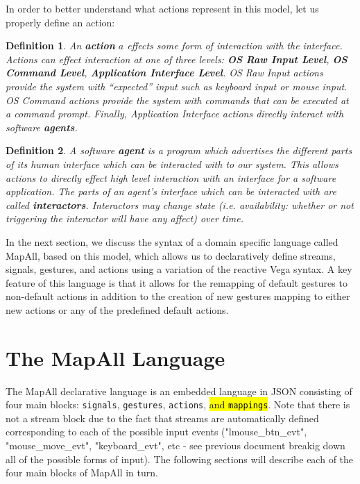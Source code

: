 \documentclass{article}
\newtheorem{define}{Definition}
\begin{document}
In order to better understand what actions represent in this model, let us properly define an action:

\begin{define}
\label{def:action}
An \textbf{action} $a$ effects some form of interaction with the interface.
Actions can effect interaction at one of three levels: \textbf{OS Raw Input Level}, \textbf{OS Command Level}, \textbf{Application Interface Level}. OS Raw Input actions provide the system with ``expected'' input such as keyboard input or mouse input. OS Command actions provide the system with commands that can be executed at a command prompt. Finally, Application Interface actions directly interact with software \textbf{agents}.
\end{define}

\begin{define}
\label{def:agent}
A software \textbf{agent} is a program which advertises the different parts of its human interface which can be interacted with to our system.
This allows actions to directly effect high level interaction with an interface for a software application. The parts of an agent's interface which can be interacted with are called \textbf{interactors}. Interactors may change state (i.e. availability: whether or not triggering the interactor will have any affect) over time.
\end{define}


In the next section, we discuss the syntax of a domain specific language called MapAll, based on this model, which allows us to declaratively define streams, signals, gestures, and actions using a variation of the reactive Vega syntax.
A key feature of this language is that it allows for the remapping of default gestures to non-default actions in addition to the creation of new gestures mapping to either new actions or any of the predefined default actions.


\section{The MapAll Language}

The MapAll declarative language is an embedded language in JSON consisting of four main blocks: \texttt{signals}, \texttt{gestures}, \texttt{actions}, \hl{and \texttt{mappings}}.
Note that there is not a stream block due to the fact that streams are automatically defined corresponding to each of the possible input events ("lmouse\_btn\_evt", "mouse\_move\_evt", "keyboard\_evt", etc - see previous document breakig down all of the possible forms of input). The following sections will describe each of the four main blocks of MapAll in turn.
\end{document}

